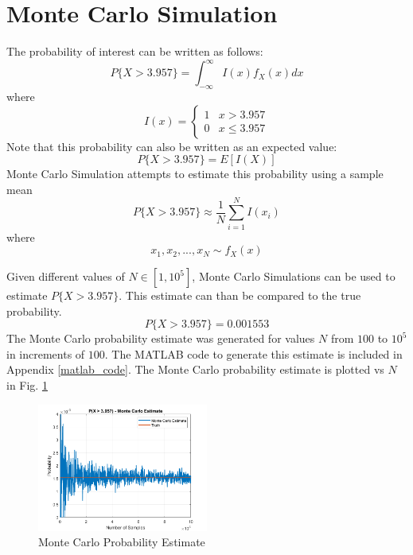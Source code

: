 \documentclass[conference]{IEEEtran}
\begin{document}
\section{Monte Carlo Simulation}
The probability of interest can be written as follows:
\begin{equation}
P\{X > 3.957\} = \int_{-\infty}^{\infty}I(x)f_X(x)dx
\label{Pint}
\end{equation}
where
\begin{equation}
I(x) = \begin{cases}
1 & x > 3.957 \\
0 & x \leq 3.957
\end{cases}
\label{Ix_def}
\end{equation}
Note that this probability can also be written as an expected value:
\begin{equation}
P\{X > 3.957\} = E[I(X)]
\end{equation}
Monte Carlo Simulation attempts to estimate this probability using a sample mean
\begin{equation}
P\{X > 3.957\} \approx \frac{1}{N}\sum_{i=1}^{N}I(x_i)
\end{equation}
where
\begin{equation}
x_1, x_2, ..., x_N \sim f_X(x)
\end{equation}
\par
Given different values of $N \in [1, 10^5]$, Monte Carlo Simulations can be used to estimate $P\{X > 3.957\}$. This estimate can than be compared to the true probability.
\begin{equation}
P\{X > 3.957\} = 0.001553
\end{equation}
The Monte Carlo probability estimate was generated for values $N$ from $100$ to $10^5$ in increments of $100$. The MATLAB code to generate this estimate is included in Appendix \ref{matlab_code}. The Monte Carlo probability estimate is plotted vs $N$ in Fig. \ref{Monte Carlo Estimate}
\begin{figure}[H]
\centerline{\includegraphics[width=0.5\textwidth]{Monte_Carlo_Estimate.png}}
\caption{Monte Carlo Probability Estimate}
\label{Monte Carlo Estimate}
\end{figure}
\end{document}
